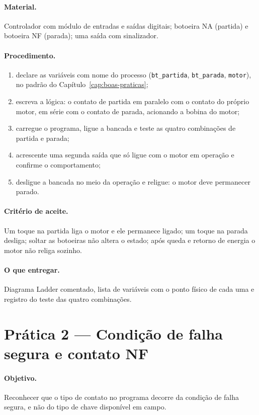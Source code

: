 \paragraph{Material.} Controlador com módulo de entradas e saídas digitais; botoeira NA (partida) e
botoeira NF (parada); uma saída com sinalizador.

\paragraph{Procedimento.}
\begin{enumerate}
  \item declare as variáveis com nome do processo (\texttt{bt\_partida}, \texttt{bt\_parada},
        \texttt{motor}), no padrão do Capítulo~\ref{cap:boas-praticas};
  \item escreva a lógica: o contato de partida em paralelo com o contato do próprio motor, em série
        com o contato de parada, acionando a bobina do motor;
  \item carregue o programa, ligue a bancada e teste as quatro combinações de partida e parada;
  \item acrescente uma segunda saída que só ligue com o motor em operação e confirme o
        comportamento;
  \item desligue a bancada no meio da operação e religue: o motor deve permanecer parado.
\end{enumerate}

\paragraph{Critério de aceite.} Um toque na partida liga o motor e ele permanece ligado; um toque na
parada desliga; soltar as botoeiras não altera o estado; após queda e retorno de energia o motor não
religa sozinho.

\paragraph{O que entregar.} Diagrama Ladder comentado, lista de variáveis com o ponto físico de cada
uma e registro do teste das quatro combinações.

\section{Prática 2 --- Condição de falha segura e contato NF}

\paragraph{Objetivo.} Reconhecer que o tipo de contato no programa decorre da condição de falha
segura, e não do tipo de chave disponível em campo.

